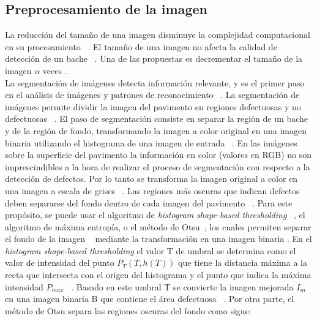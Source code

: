 \subsection{Preprocesamiento de la imagen}
La reducción del tamaño de una imagen  disminuye la complejidad computacional en su procesamiento ~. 
El tamaño de una imagen no afecta la calidad de detección de un bache ~. Una de las propuestas 
es decrementar el tamaño de la imagen $\alpha$ veces . \\
La segmentación de imágenes detecta información relevante, y es el primer paso en el análisis de imágenes y patrones
de reconocimiento ~.
La segmentación de imágenes permite  dividir la imagen del pavimento en regiones defectuosas y no defectuosas ~.
El paso de segmentación consiste en separar la región de un bache y de la región de fondo, transformando la imagen a color original 
en una imagen binaria utilizando el histograma de una imagen de entrada ~.
En las imágenes sobre la superficie del pavimento la información en color (valores en RGB) no son imprescindibles a la hora de realizar 
el proceso de segmentación con respecto a la detección de defectos. Por lo tanto se  transforma la imagen original a color en una 
imagen a escala de grises  ~. Las regiones más oscuras que indican defectos deben separarse del fondo 
dentro de cada imagen del pavimento ~. Para este propósito, se puede usar el algoritmo de 
\emph{histogram shape-based thresholding} ~, el algoritmo de máxima entropía, o el método de Otsu~, 
los cuales permiten separar el fondo de la imagen ~ mediante la transformación en una imagen binaria . 
En el \emph{histogram shape-based thresholding} el valor T de umbral se determina como el valor de intensidad del punto $P_T(T, h(T))$ que tiene la distancia máxima a la recta 
que intersecta con el origen del histograma y el punto que indica la máxima intensidad $P_{max}$ ~. 
Basado en este umbral T se convierte la imagen mejorada $I_{m}$ en una imagen binaria B que contiene el área defectuosa ~.
Por otra parte, el método de Otsu separa las regiones oscuras del fondo como sigue:

